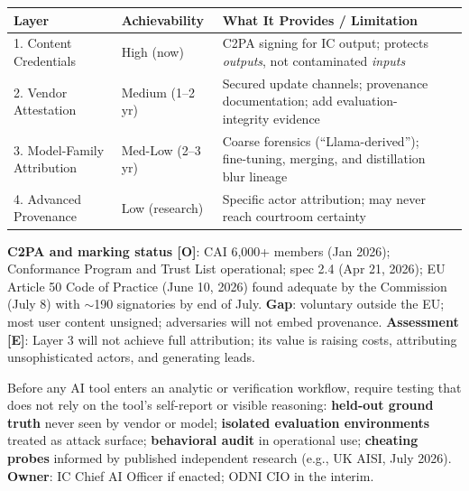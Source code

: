 \documentclass[11pt,letterpaper]{article}
\begin{document}
\begin{defbox}
\begin{center}
\scriptsize
\begin{tabularx}{\linewidth}{ZY{0.71}Y{0.57}Y{1.72}}
\toprule
\textbf{Layer} & \textbf{Achievability} & \textbf{What It Provides / Limitation} \\
. Content Credentials & High (now) & C2PA signing for IC output; protects \textit{outputs}, not contaminated \textit{inputs} \\
2. Vendor Attestation & Medium (1--2 yr) & Secured update channels; provenance documentation; add evaluation-integrity evidence \\
3. Model-Family Attribution & Med-Low (2--3 yr) & Coarse forensics (``Llama-derived''); fine-tuning, merging, and distillation blur lineage \\
4. Advanced Provenance & Low (research) & Specific actor attribution; may never reach courtroom certainty \\
\bottomrule
\end{tabularx}
\end{center}
\textbf{C2PA and marking status [O]}: CAI 6,000+ members (Jan 2026); Conformance Program and Trust List operational; spec 2.4 (Apr 21, 2026); EU Article 50 Code of Practice (June 10, 2026) found adequate by the Commission (July 8) with $\sim$190 signatories by end of July. \textbf{Gap}: voluntary outside the EU; most user content unsigned; adversaries will not embed provenance. \textbf{Assessment [E]}: Layer 3 will not achieve full attribution; its value is raising costs, attributing unsophisticated actors, and generating leads.
\end{defbox}

\begin{recbox}
Before any AI tool enters an analytic or verification workflow, require testing that does not rely on the tool's self-report or visible reasoning: \textbf{held-out ground truth} never seen by vendor or model; \textbf{isolated evaluation environments} treated as attack surface; \textbf{behavioral audit} in operational use; \textbf{cheating probes} informed by published independent research (e.g., UK AISI, July 2026). \textbf{Owner}: IC Chief AI Officer if enacted; ODNI CIO in the interim.
\end{recbox}
\end{document}
